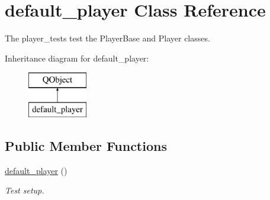 \hypertarget{classdefault__player}{\section{default\-\_\-player Class Reference}
\label{classdefault__player}
}


The player\-\_\-tests test the Player\-Base and Player classes.  


Inheritance diagram for default\-\_\-player\-:\begin{figure}[H]
\begin{center}
\leavevmode
\includegraphics[height=2.000000cm]{classdefault__player}
\end{center}
\end{figure}
\subsection*{Public Member Functions}
\begin{DoxyCompactItemize}
\item 
\hyperlink{classdefault__player_ad6c81fa5385139b5350e4b591844a046}{default\-\_\-player} ()
\begin{DoxyCompactList}\small\item\em Test setup. \end{DoxyCompactList}\end{DoxyCompactItemize}
